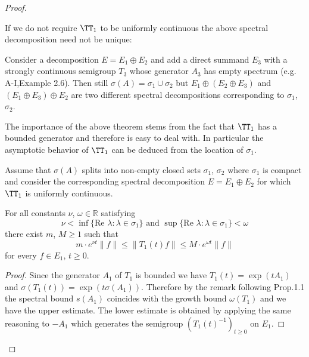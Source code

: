 \begin{proof}
\newpage
\begin{example}\label{ex:a3-3.4}
	
	If we do not require $\TT_{1}$ to be uniformly continuous the above spectral decomposition need not be unique:
	
	Consider a decomposition $E = E_{1} \oplus E_{2}$ and add a direct summand $E_{3}$ with a strongly continuous semigroup $T_{3}$ whose generator $A_{3}$ has empty spectrum (e.g. A-I,Example 2.6).
	Then still $\sigma(A) = \sigma_{1} \cup \sigma_{2}$ but $E_{1} \oplus (E_{2} \oplus E_{3})$ and $(E_{1} \oplus E_{3}) \oplus E_{2}$ are two different spectral decompositions corresponding to $\sigma_{1}$, $\sigma_{2}$.
\end{example}

The importance of the above theorem stems from the fact that $\TT_{1}$ has a bounded generator and therefore is easy to deal with.
In particular the asymptotic behavior of $\TT_{1}$ can be deduced from the location of $\sigma_{1}$.

\begin{corollary}\label{cor:a3-3.4}
	
	Assume that $\sigma(A)$ splits into non-empty closed sets $\sigma_{1}$, $\sigma_{2}$ where $\sigma_{1}$ is compact and consider the corresponding spectral decomposition $E = E_{1} \oplus E_{2}$ for which $\TT_{1}$ is uniformly continuous.
	
	For all constants $\nu$, $\omega \in \mathbb{R}$ satisfying
	\[
	\nu < \inf \{\text{Re }\lambda \colon \lambda \in \sigma_{1}\} \text{ and } \sup \{\text{Re }\lambda \colon \lambda \in \sigma_{1}\} < \omega
	\]
	there exist $m$, $M \geq 1$ such that
	\[
	m \cdot e^{\nu t}\|f\| \leq \|T_{1}(t)f\| \leq M \cdot e^{\omega t}\|f\|
	\]
	for every $f \in E_{1}$, $t \geq 0$.
\end{corollary}

\begin{proof}
	Since the generator $A_{1}$ of $T_{1}$ is bounded we have $T_{1}(t) = \exp(tA_{1})$ and $\sigma(T_{1}(t)) = \exp(t\sigma(A_{1}))$.
	Therefore by the remark following Prop.1.1 the spectral bound $s(A_{1})$ coincides with the growth bound $\omega(T_{1})$ and we have the upper estimate.
	The lower estimate is obtained by applying the same reasoning to $-A_{1}$ which generates the semigroup $(T_{1}(t)^{-1})_{t \geq 0}$ on $E_{1}$.
\end{proof}


\end{proof}
